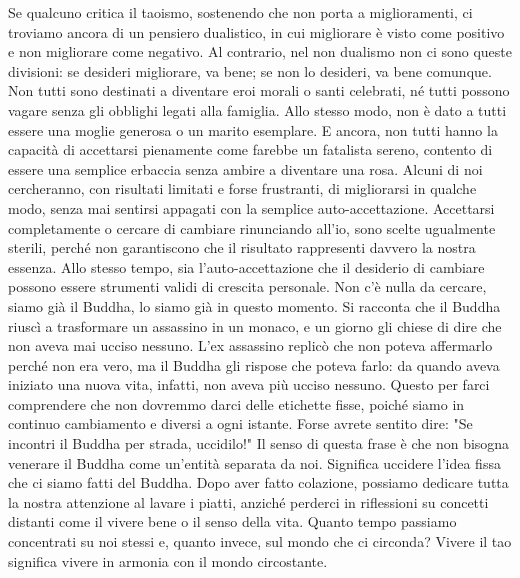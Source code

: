 \documentclass[12pt]{book} %
\begin{document}
Se qualcuno critica il taoismo, sostenendo che non porta a miglioramenti, ci troviamo ancora di un pensiero dualistico, in cui migliorare è visto come positivo e non migliorare come negativo. Al contrario, nel non dualismo non ci sono queste divisioni: se desideri migliorare, va bene; se non lo desideri, va bene comunque.
Non tutti sono destinati a diventare eroi morali o santi celebrati, né tutti possono vagare senza gli obblighi legati alla famiglia. Allo stesso modo, non è dato a tutti essere una moglie generosa o un marito esemplare. E ancora, non tutti hanno la capacità di accettarsi pienamente come farebbe un fatalista sereno, contento di essere una semplice erbaccia senza ambire a diventare una rosa. Alcuni di noi cercheranno, con risultati limitati e forse frustranti, di migliorarsi in qualche modo, senza mai sentirsi appagati con la semplice auto-accettazione. Accettarsi completamente o cercare di cambiare rinunciando all'io, sono scelte ugualmente sterili, perché non garantiscono che il risultato rappresenti davvero la nostra essenza.
Allo stesso tempo, sia l’auto-accettazione che il desiderio di cambiare possono essere strumenti validi di crescita personale.
Non c'è nulla da cercare, siamo già il Buddha, lo siamo già in questo momento.
Si racconta che il Buddha riuscì a trasformare un assassino in un monaco, e un giorno gli chiese di dire che non aveva mai ucciso nessuno. L'ex assassino replicò che non poteva affermarlo perché non era vero, ma il Buddha gli rispose che poteva farlo: da quando aveva iniziato una nuova vita, infatti, non aveva più ucciso nessuno. Questo per farci comprendere che non dovremmo darci delle etichette fisse, poiché siamo in continuo cambiamento e diversi a ogni istante.
Forse avrete sentito dire: "Se incontri il Buddha per strada, uccidilo!" Il senso di questa frase è che non bisogna venerare il Buddha come un’entità separata da noi. Significa uccidere l'idea fissa che ci siamo fatti del Buddha.
Dopo aver fatto colazione, possiamo dedicare tutta la nostra attenzione al lavare i piatti, anziché perderci in riflessioni su concetti distanti come il vivere bene o il senso della vita. Quanto tempo passiamo concentrati su noi stessi e, quanto invece, sul mondo che ci circonda? Vivere il tao significa vivere in armonia con il mondo circostante.
\end{document}
